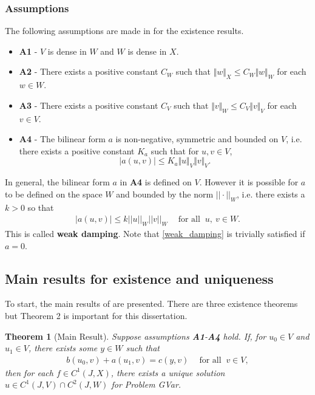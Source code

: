 \documentclass[../../main.tex]{subfiles}
\begin{document}
\subsubsection*{Assumptions} \label{sssec:existence:Assumptions}
The following assumptions are made in \cite{VV02} for the existence results.
\begin{itemize}
	\item[] \textbf{A1} - $V$ is dense in $W$ and $W$ is dense in $X$.

	\item[] \textbf{A2} - There exists a positive constant $C_{W}$ such that $\Vert w\Vert_{X} \leq C_{W}\Vert w\Vert_{W}$ for each $ w\in W$.

	\item[] \textbf{A3} - There exists a positive constant $C_{V}$ such that $\Vert v\Vert_{W} \leq C_{V}\Vert v\Vert_{V}$ for each $v \in V$.

	\item[] \textbf{A4} - The bilinear form $a$ is non-negative, symmetric and bounded on $V$, i.e. there exists a positive constant $K_a$ such that for $\displaystyle u,v \in V$, \[|a(u,v)| \leq K_a\Vert u \Vert_V \Vert v \Vert_V.\]
\end{itemize}


In general, the bilinear form $a$ in \textbf{A4} is defined on $V$. However it is possible for $a$ to be defined on the space $W$ and bounded by the norm $||\cdot||_W$, i.e. there exists a $k > 0$ so that
\begin{eqnarray}
	|a(u,v)| \leq k ||u||_W||v||_W \ \ \ \ \textrm{ for all } \ u,\ v \in W. \label{weak_damping}
\end{eqnarray} This is called \textbf{weak damping}. Note that \eqref{weak_damping} is trivially satisfied if $a = 0$.



\subsection{Main results for existence and uniqueness}\label{ssec:existence:MainResultsExistence}
To start, the main results of \cite{VV02} are presented. There are three existence theorems but Theorem 2 is important for this dissertation.

\newtheorem{Thmx}{Theorem}
\begin{Thmx}[{Main Result}]
	Suppose assumptions \textbf{A1}-\textbf{A4} hold. If, for $u_0 \in V$ and $u_1 \in V$, there exists some $y \in W$ such that
	\begin{eqnarray}
		b(u_0,v) + a(u_1,v) = c(y,v) \ \ \ \ \textrm{ for all } \ v \in V, \label{bilinear_equation}
	\end{eqnarray}
	then for each $f \in C^1(J,X)$, there exists a unique solution $u \in C^1(J,V)\cap C^2(J,W)$ for Problem GVar.
\end{Thmx}
\end{document}

